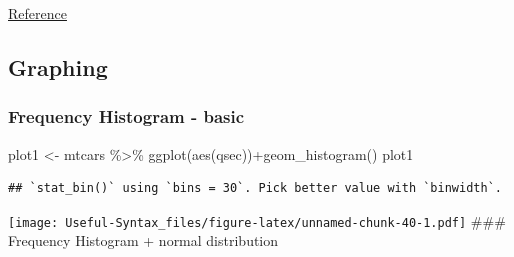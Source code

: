\documentclass[
]{article}
\newenvironment{Shaded}{\begin{snugshade}}{\end{snugshade}}
\newcommand{\AttributeTok}[1]{\textcolor[rgb]{0.77,0.63,0.00}{#1}}
\newcommand{\CommentTok}[1]{\textcolor[rgb]{0.56,0.35,0.01}{\textit{#1}}}
\newcommand{\FunctionTok}[1]{\textcolor[rgb]{0.00,0.00,0.00}{#1}}
\newcommand{\NormalTok}[1]{#1}
\newcommand{\OtherTok}[1]{\textcolor[rgb]{0.56,0.35,0.01}{#1}}
\newcommand{\SpecialCharTok}[1]{\textcolor[rgb]{0.00,0.00,0.00}{#1}}
\begin{document}
\href{https://cran.r-project.org/web/packages/corrplot/vignettes/corrplot-intro.html}{Reference}

\hypertarget{graphing}{%
\subsection{Graphing}\label{graphing}}

\hypertarget{frequency-histogram---basic}{%
\subsubsection{Frequency Histogram - basic}\label{frequency-histogram---basic}}

\begin{Shaded}
\begin{Highlighting}[]
\NormalTok{plot1 }\OtherTok{\textless{}{-}}\NormalTok{ mtcars }\SpecialCharTok{\%\textgreater{}\%} \FunctionTok{ggplot}\NormalTok{(}\FunctionTok{aes}\NormalTok{(qsec))}\SpecialCharTok{+}\FunctionTok{geom\_histogram}\NormalTok{()}
\NormalTok{plot1}
\end{Highlighting}
\end{Shaded}

\begin{verbatim}
## `stat_bin()` using `bins = 30`. Pick better value with `binwidth`.
\end{verbatim}

\texttt{[image: Useful-Syntax\_files/figure-latex/unnamed-chunk-40-1.pdf]}
\#\#\# Frequency Histogram + normal distribution

\begin{Shaded}
\end{Shaded}
\end{document}
